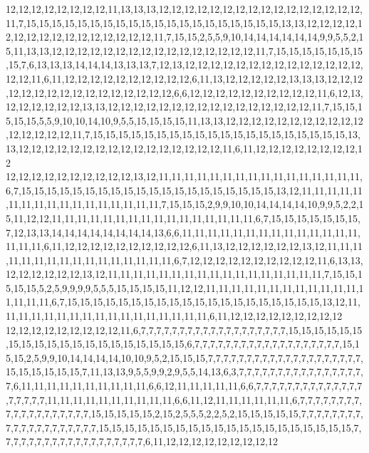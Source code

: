 12,12,12,12,12,12,12,12,11,13,13,13,12,12,12,12,12,12,12,12,12,12,12,12,12,12,12,12,11,7,15,15,15,15,15,15,15,15,15,15,15,15,15,15,15,15,15,15,15,15,13,13,12,12,12,12,12,12,12,12,12,12,12,12,12,12,12,12,11,7,15,15,2,5,5,9,10,14,14,14,14,14,14,9,9,5,5,2,15,11,13,13,12,12,12,12,12,12,12,12,12,12,12,12,12,12,12,12,11,7,15,15,15,15,15,15,15,15,7,6,13,13,13,14,14,14,13,13,13,7,12,13,12,12,12,12,12,12,12,12,12,12,12,12,12,12,12,12,11,6,11,12,12,12,12,12,12,12,12,12,12,6,11,13,12,12,12,12,12,13,13,13,12,12,12,12,12,12,12,12,12,12,12,12,12,12,12,12,6,6,12,12,12,12,12,12,12,12,12,12,11,6,12,13,12,12,12,12,12,12,13,13,12,12,12,12,12,12,12,12,12,12,12,12,12,12,12,12,11,7,15,15,15,15,15,5,5,9,10,10,14,10,9,5,5,15,15,15,15,11,13,13,12,12,12,12,12,12,12,12,12,12,12,12,12,12,12,12,11,7,15,15,15,15,15,15,15,15,15,15,15,15,15,15,15,15,15,15,15,15,13,13,12,12,12,12,12,12,12,12,12,12,12,12,12,12,12,12,11,6,11,12,12,12,12,12,12,12,12,12
12,12,12,12,12,12,12,12,12,12,13,12,11,11,11,11,11,11,11,11,11,11,11,11,11,11,11,11,6,7,15,15,15,15,15,15,15,15,15,15,15,15,15,15,15,15,15,15,15,15,13,12,11,11,11,11,11,11,11,11,11,11,11,11,11,11,11,11,11,7,15,15,15,2,9,9,10,10,14,14,14,14,10,9,9,5,2,2,15,11,12,12,11,11,11,11,11,11,11,11,11,11,11,11,11,11,11,11,6,7,15,15,15,15,15,15,15,7,12,13,13,14,14,14,14,14,14,14,14,13,6,6,11,11,11,11,11,11,11,11,11,11,11,11,11,11,11,11,11,6,11,12,12,12,12,12,12,12,12,12,12,6,11,13,12,12,12,12,12,12,13,12,11,11,11,11,11,11,11,11,11,11,11,11,11,11,11,11,6,7,12,12,12,12,12,12,12,12,12,12,11,6,13,13,12,12,12,12,12,12,13,12,11,11,11,11,11,11,11,11,11,11,11,11,11,11,11,11,11,7,15,15,15,15,15,5,2,5,9,9,9,9,5,5,5,15,15,15,15,11,12,12,11,11,11,11,11,11,11,11,11,11,11,11,11,11,11,11,6,7,15,15,15,15,15,15,15,15,15,15,15,15,15,15,15,15,15,15,15,15,13,12,11,11,11,11,11,11,11,11,11,11,11,11,11,11,11,11,11,6,11,12,12,12,12,12,12,12,12,12
12,12,12,12,12,12,12,12,12,11,6,7,7,7,7,7,7,7,7,7,7,7,7,7,7,7,7,7,7,7,15,15,15,15,15,15,15,15,15,15,15,15,15,15,15,15,15,15,15,15,6,7,7,7,7,7,7,7,7,7,7,7,7,7,7,7,7,7,7,7,15,15,15,2,5,9,9,10,14,14,14,14,10,10,9,5,2,15,15,15,7,7,7,7,7,7,7,7,7,7,7,7,7,7,7,7,7,7,7,7,15,15,15,15,15,15,7,11,13,13,9,5,5,9,9,2,9,5,5,14,13,6,3,7,7,7,7,7,7,7,7,7,7,7,7,7,7,7,7,7,6,11,11,11,11,11,11,11,11,11,11,6,6,12,11,11,11,11,11,6,6,7,7,7,7,7,7,7,7,7,7,7,7,7,7,7,7,7,7,7,11,11,11,11,11,11,11,11,11,11,6,6,11,12,11,11,11,11,11,11,6,7,7,7,7,7,7,7,7,7,7,7,7,7,7,7,7,7,7,7,15,15,15,15,15,2,15,2,5,5,5,2,2,5,2,15,15,15,15,15,7,7,7,7,7,7,7,7,7,7,7,7,7,7,7,7,7,7,7,7,15,15,15,15,15,15,15,15,15,15,15,15,15,15,15,15,15,15,15,15,7,7,7,7,7,7,7,7,7,7,7,7,7,7,7,7,7,7,7,6,11,12,12,12,12,12,12,12,12,12
